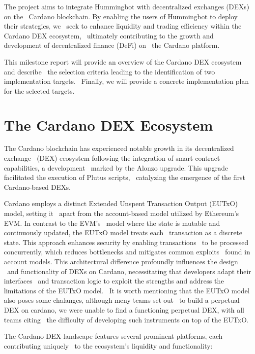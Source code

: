 \documentclass{scrreport}
\begin{document}
The project aims to integrate Hummingbot with decentralized exchanges (DEXs) on the \
Cardano blockchain. By enabling the users of Hummingbot to deploy their strategies, we \
seek to enhance liquidity and trading efficiency within the Cardano DEX ecosystem, \
ultimately contributing to the growth and development of decentralized finance (DeFi) on \
the Cardano platform.

This milestone report will provide an overview of the Cardano DEX ecosystem and describe \
the selection criteria leading to the identification of two implementation targets. \
Finally, we will provide a concrete implementation plan for the selected targets.

\section{The Cardano DEX Ecosystem}

The Cardano blockchain has experienced notable growth in its decentralized exchange \
(DEX) ecosystem following the integration of smart contract capabilities, a development \
marked by the Alonzo upgrade. This upgrade facilitated the execution of Plutus scripts, \
catalyzing the emergence of the first Cardano-based DEXs.

Cardano employs a distinct Extended Unspent Transaction Output (EUTxO) model, setting it \
apart from the account-based model utilized by Ethereum's EVM. In contrast to the EVM’s \
model where the state is mutable and continuously updated, the EUTxO model treats each \
transaction as a discrete state. This approach enhances security by enabling transactions \
to be processed concurrently, which reduces bottlenecks and mitigates common exploits \
found in account models. This architectural difference profoundly influences the design \
and functionality of DEXs on Cardano, necessitating that developers adapt their interfaces \
and transaction logic to exploit the strengths and address the limitations of the EUTxO model. \
It is worth mentioning that the EUTxO model also poses some chalanges, although meny teams set out \
to build a perpetual DEX on cardano, we were unable to find a functioning perpetual DEX, with all teams citing \
the difficulty of developing such instruments on top of the EUTxO. 

The Cardano DEX landscape features several prominent platforms, each contributing uniquely \
to the ecosystem’s liquidity and functionality:
\end{document}
